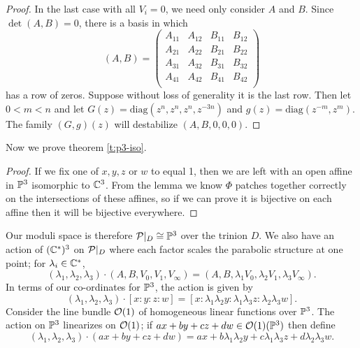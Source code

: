 \begin{proof}
		In the last case with all $V_i=0$, we need only consider $A$ and $B$. Since $\det(A,B) = 0$, there is a basis in which
		\begin{equation}
			(A,B) = 
			\begin{pmatrix}
		A_{11} & A_{12}	& B_{11} & B_{12}\\
		A_{21} & A_{22} & B_{21} & B_{22}\\
		A_{31} & A_{32} & B_{31} & B_{32}\\
		A_{41} & A_{42} & B_{41} & B_{42}\\
			\end{pmatrix}
		\end{equation}
		has a row of zeros. Suppose without loss of generality it is the last row. Then let $0 < m < n$ and let $G(z) = \text{diag}(z^{n}, z^{n}, z^{n}, z^{-3n})$ and $g(z) = \text{diag}(z^{-m}, z^{m})$. The family $(G,g)(z)$ will destabilize $(A,B,0,0,0)$. 
	
	\end{proof}
	Now we prove theorem \ref{t:p3-iso}.
	\begin{proof}
		If we fix one of $x,y,z$ or $w$ to equal 1, then we are left with an open affine in $\mathbb{P}^3$ isomorphic to $\mathbb{C}^3$. From the lemma we know $\Phi$ patches together correctly on the intersections of these affines, so if we can prove it is bijective on each affine then it will be bijective everywhere. 
	\end{proof}
	Our moduli space is therefore $\mathcal{P}|_D \cong \mathbb{P}^3$ over the trinion $D$. We also have an action of $(\mathbb{C}^\ast)^3$ on $\mathcal{P}|_D$ where each factor scales the parabolic structure at one point; for $\lambda_i\in \mathbb{C}^\ast$,
	\begin{equation}
		(\lambda_1,\lambda_2,\lambda_3)\cdot (A,B,V_0,V_1,V_\infty) = (A,B,\lambda_1 V_0, \lambda_2 V_1, \lambda_3 V_\infty).
	\end{equation}
	In terms of our co-ordinates for $\mathbb{P}^3$, the action is given by
	\begin{equation}
		(\lambda_1, \lambda_2,\lambda_3)\cdot [x:y:z:w] = [x:\lambda_1\lambda_2 y: \lambda_1\lambda_3 z: \lambda_2\lambda_3 w].
	\end{equation}
	Consider the line bundle $\mathcal{O}(1)$ of homogeneous linear functions over $\mathbb{P}^3$. The action on $\mathbb{P}^3$ linearizes on $\mathcal{O}(1)$; if $ax+by+cz+dw \in \mathcal{O}(1)(\mathbb{P}^3)$ then define
	\begin{equation}
	(\lambda_1, \lambda_2,\lambda_3) \cdot (ax+by+cz+dw) = ax +b\lambda_1\lambda_2 y + c\lambda_1\lambda_3 z + d\lambda_2\lambda_3 w. 
	\end{equation}
	

